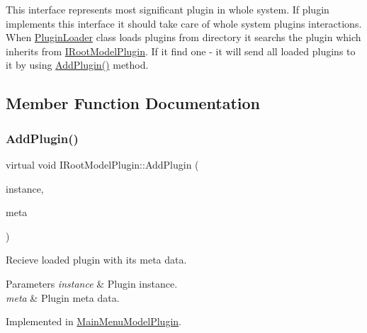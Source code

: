This interface represents most significant plugin in whole system. If plugin implements this interface it should take care of whole system plugins interactions. When \hyperlink{class_plugin_loader}{Plugin\+Loader} class loads plugins from directory it searchs the plugin which inherits from \hyperlink{class_i_root_model_plugin}{I\+Root\+Model\+Plugin}. If it find one -\/ it will send all loaded plugins to it by using \hyperlink{class_i_root_model_plugin_a6c5a6562b3fc16264d36aa6e39b84a7f}{Add\+Plugin()} method. 

\subsection{Member Function Documentation}
\mbox{\label{class_i_root_model_plugin_a6c5a6562b3fc16264d36aa6e39b84a7f}} 
\subsubsection{\texorpdfstring{Add\+Plugin()}{AddPlugin()}}
{\footnotesize\ttfamily virtual void I\+Root\+Model\+Plugin\+::\+Add\+Plugin (\begin{DoxyParamCaption}\item[{Q\+Object $\ast$}]{instance,  }\item[{Q\+Json\+Object $\ast$}]{meta }\end{DoxyParamCaption})\hspace{0.3cm}{\ttfamily [pure virtual]}}



Recieve loaded plugin with it\textquotesingle{}s meta data. 


\begin{DoxyParams}{Parameters}
{\em instance} & Plugin instance. \\
\hline
{\em meta} & Plugin meta data. \\
\hline
\end{DoxyParams}


Implemented in \hyperlink{class_main_menu_model_plugin_aedb87208e81b8ee847fc694805364288}{Main\+Menu\+Model\+Plugin}.

\mbox{\label{class_i_root_model_plugin_a9ee55034608480fda71b7700d3495984}} 
